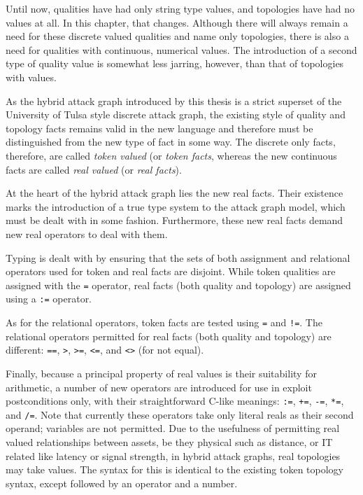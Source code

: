 Until now, qualities have had only string type values, and
topologies have had no values at all. In this chapter, that changes. Although
there will always remain a need for these discrete valued qualities and name
only topologies, there is also a need for qualities with 
continuous, numerical values. The introduction of a second type of quality
value is somewhat less jarring, however, than that of topologies with
values.

As the hybrid attack graph introduced by this thesis is a strict superset
of the University of Tulsa style discrete attack graph, the existing style
of quality and topology facts remains valid in the new language and therefore
must be distinguished from the new type of fact in some way. The discrete
only facts, therefore, are called \emph{token valued} (or \emph{token facts},
whereas the new continuous facts are called \emph{real valued} (or \emph{real
facts}).

At the heart of the hybrid attack graph lies the new real facts. Their
existence marks the introduction of a true type system to the attack graph
model, which must be dealt with in some fashion. Furthermore, these new real 
facts demand new real operators to deal with them.

Typing is dealt with by ensuring that the sets of both assignment and relational
operators used for token and real facts are disjoint. While token qualities are
assigned with the \texttt{=} operator, real facts (both quality and topology)
are assigned using a \texttt{:=} operator.

As for the relational operators, token facts are tested using \texttt{=} 
and \texttt{!=}. The relational operators permitted for real facts (both
quality and topology) are different: \texttt{==}, \texttt{>}, \texttt{>=},
\texttt{<=}, and \texttt{<>} (for not equal).

Finally, because a principal property of real values is their suitability for
arithmetic, a number of new operators are introduced for use in exploit
postconditions only, with their straightforward C-like meanings: \texttt{:=},
\texttt{+=}, \texttt{-=}, \texttt{*=}, and \texttt{/=}. Note that currently
these operators take only literal reals as their second operand; variables
are not permitted.
Due to the usefulness of permitting real valued relationships between assets,
be they physical such as distance, or IT related like latency or signal
strength, in hybrid attack graphs, real topologies may take values. The
syntax for this is identical to the existing token topology syntax, except
followed by an operator and a number.

